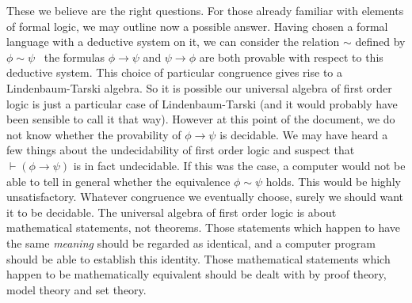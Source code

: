 These we believe are the right questions. For those already familiar
with elements of formal logic, we may outline now a possible answer.
Having chosen a formal language with a deductive system on it, we
can consider the relation $\sim$ defined by $\phi\sim\psi$ \ifand\
the formulas $\phi\rightarrow\psi$ and $\psi\rightarrow\phi$ are
both provable with respect to this deductive system. This choice of
particular congruence gives rise to a Lindenbaum-Tarski algebra. So
it is possible our universal algebra of first order logic is just a
particular case of Lindenbaum-Tarski (and it would probably have
been sensible to call it that way). However at this point of the
document, we do not know whether the provability of
$\phi\rightarrow\psi$ is decidable. We may have heard a few things
about the undecidability of first order logic and suspect that
$\vdash(\phi\rightarrow\psi)$ is in fact undecidable. If this was
the case, a computer would not be able to tell in general whether
the equivalence $\phi\sim\psi$ holds. This would be highly
unsatisfactory. Whatever congruence we eventually choose, surely we
should want it to be decidable. The universal algebra of first order
logic is about mathematical statements, not theorems. Those
statements which happen to have the same {\em meaning} should be
regarded as identical, and a computer program should be able to
establish this identity. Those mathematical statements which happen
to be mathematically equivalent should be dealt with by proof
theory, model theory and set theory.

